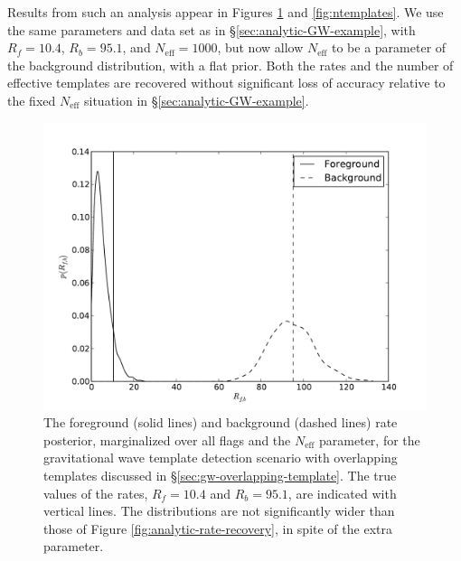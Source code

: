 \documentclass[aps,prd]{revtex4-1}
\begin{document}
Results from such an analysis appear in Figures \ref{fig:rates-nt} and
\ref{fig:ntemplates}.  We use the same parameters and data set as in
\S \ref{sec:analytic-GW-example}, with $R_f = 10.4$, $R_b = 95.1$, and
$N_\mathrm{eff} = 1000$, but now allow $N_\mathrm{eff}$ to be a
parameter of the background distribution, with a flat prior.  Both the
rates and the number of effective templates are recovered without
significant loss of accuracy relative to the fixed $N_\mathrm{eff}$
situation in \S \ref{sec:analytic-GW-example}.

\begin{figure}
  \includegraphics[width=\columnwidth]{rates-nt}
  \caption{\label{fig:rates-nt} The foreground (solid lines) and
    background (dashed lines) rate posterior, marginalized over all
    flags and the $N_\mathrm{eff}$ parameter, for the gravitational
    wave template detection scenario with overlapping templates
    discussed in \S \ref{sec:gw-overlapping-template}.  The true
    values of the rates, $R_f = 10.4$ and $R_b=95.1$, are indicated
    with vertical lines.  The distributions are not significantly
    wider than those of Figure \ref{fig:analytic-rate-recovery}, in
    spite of the extra parameter.}
\end{figure}
\end{document}
